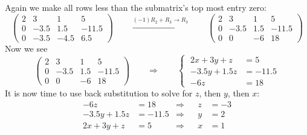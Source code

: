 \documentclass{ximera}
\begin{document}
\begin{example}
\begin{explanation}
\begin{center}
\end{center}
Again we make all rows less than the submatrix's top most entry zero:
\[
  \begin{pmatrix}
    2 & 3 & 1 & 5 \\
    0 & -3.5 & 1.5 &-11.5 \\
    0 & -3.5 & -4.5 & 6.5
  \end{pmatrix}
  \qquad\xrightarrow{(-1) R_2+R_3\to R_3}\qquad
  \begin{pmatrix}
    2 & 3 & 1 & 5 \\
    0 & -3.5 & 1.5 &-11.5 \\
    0 & 0    & -6 & 18
  \end{pmatrix}
\]
Now we see
\[
  \left(
    \begin{array}{ccc|c}
      2 & 3 & 1 & 5 \\
      0 & -3.5 & 1.5 &-11.5 \\
      0 & 0    & -6 & 18
    \end{array}
  \right)
  \qquad\Longrightarrow\qquad
  \left\{\;
    \begin{aligned}
      2x + 3y + z &= 5 \\
      -3.5y + 1.5z &= -11.5\\
      -6z &= 18
    \end{aligned}
  \right.
\]
It is now time to use back substitution to solve for $z$, then $y$, then $x$:
\begin{align*}
  -6z &= 18   &\Rightarrow & & z &= -3\\
  -3.5y+1.5z &=-11.5 &\Rightarrow & & y &= 2\\
  2x  +  3y + z &= 5 &\Rightarrow & & x &= 1
\end{align*}

\end{explanation}
\end{example}
\end{document}
